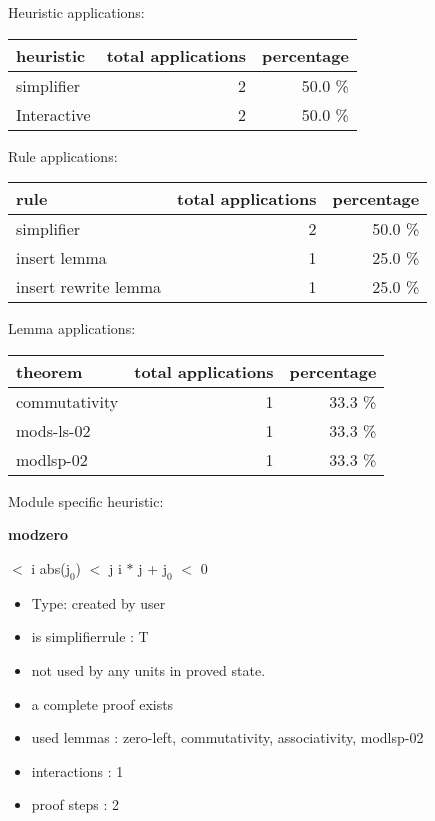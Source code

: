 \documentclass[a4paper]{article}
\begin{document}
\medskip


Heuristic applications:

\begin{supertabular}{l|r|r}
heuristic	& total applications & percentage \\ \hline
simplifier & 2 & 50.0 \% \\
Interactive & 2 & 50.0 \% \\

\end{supertabular}

Rule applications:

\begin{supertabular}{l|r|r}
rule	        & total applications & percentage \\ \hline
simplifier & 2 & 50.0 \% \\
insert lemma & 1 & 25.0 \% \\
insert rewrite lemma & 1 & 25.0 \% \\

\end{supertabular}

Lemma applications:

\begin{supertabular}{l|r|r}
theorem	        & total applications & percentage \\ \hline
commutativity & 1 & 33.3 \% \\
mods-ls-02 & 1 & 33.3 \% \\
modlsp-02 & 1 & 33.3 \% \\

\end{supertabular}

Module specific heuristic:

\pagebreak

{\LARGE\bf modzero}\label{lemma-modzero}

\medskip

  $<$ i \And abs($\mbox{j}_{0}$) $<$ j \Imp \Not i $*$ j + $\mbox{j}_{0}$ $<$ 0

\begin{itemize}

\item Type: created by user

\item is simplifierrule : T
\item not used by any units in proved state.
\item       a complete proof exists
\item       used lemmas  : zero-left, commutativity, associativity, modlsp-02
\item       interactions : 1
\item       proof steps  : 2
\end{itemize}
\end{document}
